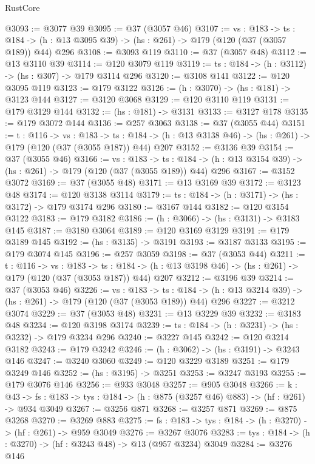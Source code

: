 \begin{lexlean}{RustCore}
\begin{coremodule}
@3093 := @3077 @39
@3095 := @37 (@3057 @46)
@3107 := {vs : @183} ->
  {ts : @184} -> (h : @13 @3095 @39) -> (hs : @261) -> @179 (@120 (@37 (@3057 @189)) @44) @296
@3108 := @3093 @119
@3110 := @37 (@3057 @48)
@3112 := @13 @3110 @39
@3114 := @120 @3079 @119
@3119 := {ts : @184} -> (h : @3112) -> (hs : @307) -> @179 @3114 @296
@3120 := @3108 @141
@3122 := @120 @3095 @119
@3123 := @179 @3122
@3126 := (h : @3070) -> (hs : @181) -> @3123 @144
@3127 := @3120 @3068
@3129 := @120 @3110 @119
@3131 := @179 @3129 @144
@3132 := (hs : @181) -> @3131
@3133 := @3127 @178
@3135 := @179 @3072 @144
@3136 := @257 @3063
@3138 := @37 (@3055 @44)
@3151 := {t : @116} ->
  {vs : @183} ->
  {ts : @184} -> (h : @13 @3138 @46) -> (hs : @261) -> @179 (@120 (@37 (@3055 @187)) @44) @207
@3152 := @3136 @39
@3154 := @37 (@3055 @46)
@3166 := {vs : @183} ->
  {ts : @184} -> (h : @13 @3154 @39) -> (hs : @261) -> @179 (@120 (@37 (@3055 @189)) @44) @296
@3167 := @3152 @3072
@3169 := @37 (@3055 @48)
@3171 := @13 @3169 @39
@3172 := @3123 @48
@3174 := @120 @3138 @3114
@3179 := {ts : @184} -> (h : @3171) -> (hs : @3172) -> @179 @3174 @296
@3180 := @3167 @144
@3182 := @120 @3154 @3122
@3183 := @179 @3182
@3186 := (h : @3066) -> (hs : @3131) -> @3183 @145
@3187 := @3180 @3064
@3189 := @120 @3169 @3129
@3191 := @179 @3189 @145
@3192 := (hs : @3135) -> @3191
@3193 := @3187 @3133
@3195 := @179 @3074 @145
@3196 := @257 @3059
@3198 := @37 (@3053 @44)
@3211 := {t : @116} ->
  {vs : @183} ->
  {ts : @184} -> (h : @13 @3198 @46) -> (hs : @261) -> @179 (@120 (@37 (@3053 @187)) @44) @207
@3212 := @3196 @39
@3214 := @37 (@3053 @46)
@3226 := {vs : @183} ->
  {ts : @184} -> (h : @13 @3214 @39) -> (hs : @261) -> @179 (@120 (@37 (@3053 @189)) @44) @296
@3227 := @3212 @3074
@3229 := @37 (@3053 @48)
@3231 := @13 @3229 @39
@3232 := @3183 @48
@3234 := @120 @3198 @3174
@3239 := {ts : @184} -> (h : @3231) -> (hs : @3232) -> @179 @3234 @296
@3240 := @3227 @145
@3242 := @120 @3214 @3182
@3243 := @179 @3242
@3246 := (h : @3062) -> (hs : @3191) -> @3243 @146
@3247 := @3240 @3060
@3249 := @120 @3229 @3189
@3251 := @179 @3249 @146
@3252 := (hs : @3195) -> @3251
@3253 := @3247 @3193
@3255 := @179 @3076 @146
@3256 := @933 @3048
@3257 := @905 @3048
@3266 := {k : @43} ->
  {fs : @183} -> {tys : @184} -> (h : @875 (@3257 @46) @883) -> (hf : @261) -> @934 @3049
@3267 := @3256 @871
@3268 := @3257 @871
@3269 := @875 @3268
@3270 := @3269 @883
@3275 := {fs : @183} -> {tys : @184} -> (h : @3270) -> (hf : @261) -> @959 @3049
@3276 := @3267 @3076
@3283 := {tys : @184} -> (h : @3270) -> (hf : @3243 @48) -> @13 (@957 @3234) @3049
@3284 := @3276 @146

\end{coremodule}
\end{lexlean}
